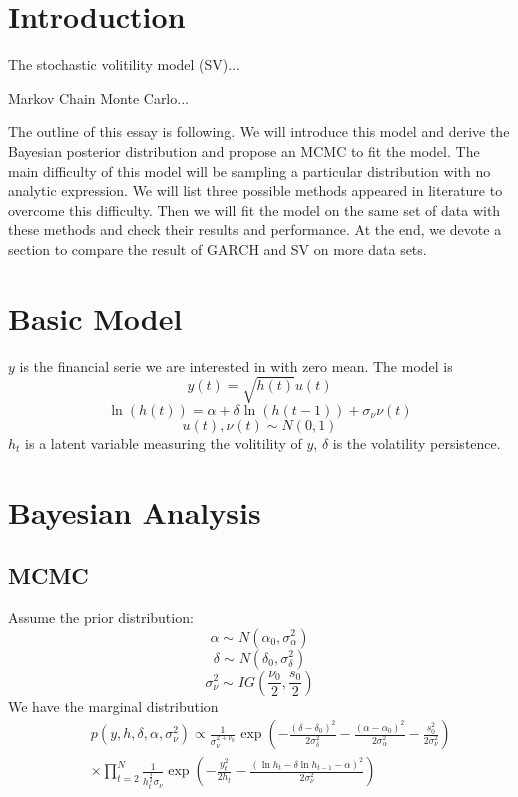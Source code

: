 \documentclass{article}
\begin{document}
\section{Introduction}
The stochastic volitility model (SV)...

Markov Chain Monte Carlo...

The outline of this essay is following. We will introduce this model and derive the Bayesian posterior distribution and propose an MCMC to fit the model. The main difficulty of this model will be sampling a particular distribution with no analytic expression. We will list three possible methods appeared in literature to overcome this difficulty. Then we will fit the model on the same set of data with these methods and check their results and performance. At the end, we devote a section to compare the result of GARCH and SV on more data sets.
\section{Basic Model}
$y$ is the financial serie we are interested in with zero mean. The model is
\[
y(t)=\sqrt{h(t)}u(t)
\]
\[
\ln(h(t))=\alpha+\delta\ln(h(t-1))+\sigma_\nu\nu(t)
\]
\[
u(t),\nu(t)\sim N(0,1)
\]
$h_t$ is a latent variable measuring the volitility of $y$, $\delta$ is the volatility persistence.

\section{Bayesian Analysis}
\subsection{MCMC}
Assume the prior distribution:
\[
\alpha\sim N(\alpha_0,\sigma_\alpha^2)
\]
\[
\delta\sim N(\delta_0,\sigma_\delta^2)
\]
\[
\sigma_\nu^2\sim IG(\frac{\nu_0}{2},\frac{s_0}{2})
\]
We have the marginal distribution
\begin{eqnarray}
&&p(y,h,\delta,\alpha,\sigma_\nu^2)\propto\frac{1}{\sigma_\nu^{2+\nu_0}}\exp\left(-\frac{(\delta-\delta_0)^2}{2\sigma_\delta^2}-\frac{(\alpha-\alpha_0)^2}{2\sigma_\alpha^2}-\frac{s_0^2}{2\sigma_\nu^2}\right)\nonumber\\
&&\times\prod_{t=2}^{N}\frac{1}{h_t^{\frac{3}{2}}\sigma_\nu}\exp\left(-\frac{y_t^2}{2h_t}-\frac{(\ln h_t-\delta\ln h_{t-1}-\alpha)^2}{2\sigma^2_\nu}\right)
\end{eqnarray}
\end{document}
